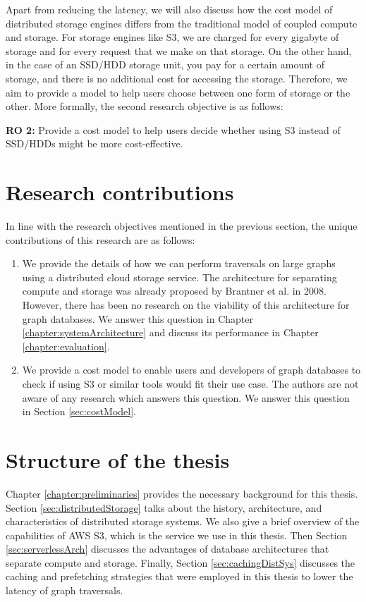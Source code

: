 \medskip
Apart from reducing the latency, we will also discuss how the cost model of
distributed storage engines differs from the traditional model of coupled
compute and storage. For storage engines like S3, we are charged for every
gigabyte of storage and for every request that we make on that
storage. On the other hand, in the case of an SSD/HDD storage unit, you pay for a
certain amount of storage, and there is no additional cost for accessing the
storage. Therefore, we aim to provide a model to help users choose between one
form of storage or the other. More formally, the second research objective is
as follows:
\begin{displayquote}
    \textbf{RO 2:} Provide a cost model to help users decide whether using S3
    instead of SSD/HDDs might be more cost-effective.
\end{displayquote}

\section{Research contributions}
In line with the research objectives mentioned in the previous section, the 
unique contributions of this research are as follows:
\begin{enumerate}
    \item We provide the details of how we can perform traversals on large
        graphs using a distributed cloud storage service. The architecture for
        separating compute and storage was already proposed by Brantner et
        al. \cite{brantner2008building} in 2008. However, there has been no
        research on the viability of this architecture for graph databases. We
        answer this question in Chapter \ref{chapter:systemArchitecture} and
        discuss its performance in Chapter \ref{chapter:evaluation}.
    \item We provide a cost model to enable users and developers of graph
        databases to check if using S3 or similar tools would fit their use case.
        The authors are not aware of any research which answers this question.
        We answer this question in Section \ref{sec:costModel}.
\end{enumerate}


\section{Structure of the thesis}

\medskip
Chapter \ref{chapter:preliminaries} provides the necessary background for
this thesis. Section \ref{sec:distributedStorage} talks about the
history, architecture, and characteristics of distributed storage systems. We
also give a brief overview of the capabilities of AWS S3, which is the service
we use in this thesis. Then
Section \ref{sec:serverlessArch} discusses the advantages of database
architectures that separate compute and storage. Finally, 
Section \ref{sec:cachingDistSys} discusses the caching and prefetching
strategies that were employed in this thesis to lower the latency of graph
traversals.

